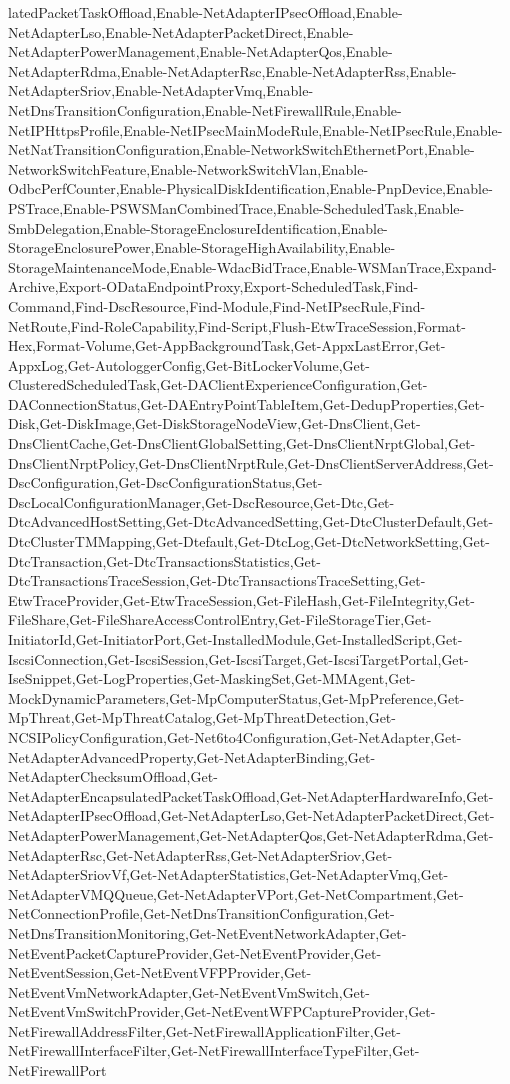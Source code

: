 {{latedPacketTaskOffload,Enable-NetAdapterIPsecOffload,Enable-NetAdapterLso,Enable-NetAdapterPacketDirect,Enable-NetAdapterPowerManagement,Enable-NetAdapterQos,Enable-NetAdapterRdma,Enable-NetAdapterRsc,Enable-NetAdapterRss,Enable-NetAdapterSriov,Enable-NetAdapterVmq,Enable-NetDnsTransitionConfiguration,Enable-NetFirewallRule,Enable-NetIPHttpsProfile,Enable-NetIPsecMainModeRule,Enable-NetIPsecRule,Enable-NetNatTransitionConfiguration,Enable-NetworkSwitchEthernetPort,Enable-NetworkSwitchFeature,Enable-NetworkSwitchVlan,Enable-OdbcPerfCounter,Enable-PhysicalDiskIdentification,Enable-PnpDevice,Enable-PSTrace,Enable-PSWSManCombinedTrace,Enable-ScheduledTask,Enable-SmbDelegation,Enable-StorageEnclosureIdentification,Enable-StorageEnclosurePower,Enable-StorageHighAvailability,Enable-StorageMaintenanceMode,Enable-WdacBidTrace,Enable-WSManTrace,Expand-Archive,Export-ODataEndpointProxy,Export-ScheduledTask,Find-Command,Find-DscResource,Find-Module,Find-NetIPsecRule,Find-NetRoute,Find-RoleCapability,Find-Script,Flush-EtwTraceSession,Format-Hex,Format-Volume,Get-AppBackgroundTask,Get-AppxLastError,Get-AppxLog,Get-AutologgerConfig,Get-BitLockerVolume,Get-ClusteredScheduledTask,Get-DAClientExperienceConfiguration,Get-DAConnectionStatus,Get-DAEntryPointTableItem,Get-DedupProperties,Get-Disk,Get-DiskImage,Get-DiskStorageNodeView,Get-DnsClient,Get-DnsClientCache,Get-DnsClientGlobalSetting,Get-DnsClientNrptGlobal,Get-DnsClientNrptPolicy,Get-DnsClientNrptRule,Get-DnsClientServerAddress,Get-DscConfiguration,Get-DscConfigurationStatus,Get-DscLocalConfigurationManager,Get-DscResource,Get-Dtc,Get-DtcAdvancedHostSetting,Get-DtcAdvancedSetting,Get-DtcClusterDefault,Get-DtcClusterTMMapping,Get-Dtefault,Get-DtcLog,Get-DtcNetworkSetting,Get-DtcTransaction,Get-DtcTransactionsStatistics,Get-DtcTransactionsTraceSession,Get-DtcTransactionsTraceSetting,Get-EtwTraceProvider,Get-EtwTraceSession,Get-FileHash,Get-FileIntegrity,Get-FileShare,Get-FileShareAccessControlEntry,Get-FileStorageTier,Get-InitiatorId,Get-InitiatorPort,Get-InstalledModule,Get-InstalledScript,Get-IscsiConnection,Get-IscsiSession,Get-IscsiTarget,Get-IscsiTargetPortal,Get-IseSnippet,Get-LogProperties,Get-MaskingSet,Get-MMAgent,Get-MockDynamicParameters,Get-MpComputerStatus,Get-MpPreference,Get-MpThreat,Get-MpThreatCatalog,Get-MpThreatDetection,Get-NCSIPolicyConfiguration,Get-Net6to4Configuration,Get-NetAdapter,Get-NetAdapterAdvancedProperty,Get-NetAdapterBinding,Get-NetAdapterChecksumOffload,Get-NetAdapterEncapsulatedPacketTaskOffload,Get-NetAdapterHardwareInfo,Get-NetAdapterIPsecOffload,Get-NetAdapterLso,Get-NetAdapterPacketDirect,Get-NetAdapterPowerManagement,Get-NetAdapterQos,Get-NetAdapterRdma,Get-NetAdapterRsc,Get-NetAdapterRss,Get-NetAdapterSriov,Get-NetAdapterSriovVf,Get-NetAdapterStatistics,Get-NetAdapterVmq,Get-NetAdapterVMQQueue,Get-NetAdapterVPort,Get-NetCompartment,Get-NetConnectionProfile,Get-NetDnsTransitionConfiguration,Get-NetDnsTransitionMonitoring,Get-NetEventNetworkAdapter,Get-NetEventPacketCaptureProvider,Get-NetEventProvider,Get-NetEventSession,Get-NetEventVFPProvider,Get-NetEventVmNetworkAdapter,Get-NetEventVmSwitch,Get-NetEventVmSwitchProvider,Get-NetEventWFPCaptureProvider,Get-NetFirewallAddressFilter,Get-NetFirewallApplicationFilter,Get-NetFirewallInterfaceFilter,Get-NetFirewallInterfaceTypeFilter,Get-NetFirewallPort}}

